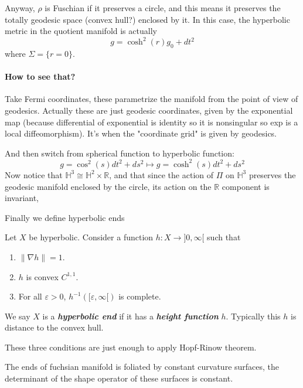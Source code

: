  Anyway, $\rho$ is Fuschian if it preserves a circle, and this means it preserves the totally geodesic space (convex hull?) enclosed by it. In this case, the hyperbolic metric in the quotient manifold is actually
 \[g=\cosh^2(r)g_0+dt^2\]
 where $\Sigma=\{r=0\}$.

 \paragraph{How to see that?}  Take Fermi coordinates, these parametrize the manifold from the point of view of geodesics. Actually these are just geodesic coordinates, given by the exponential map (because differential of exponential is identity so it is nonsingular so exp is a local diffeomorphism). It's when the "coordinate grid" is given by geodesics.

 And then switch from spherical function to hyperbolic function:
 \[g=\cos^2(s)dt^2+ds^2\longmapsto g=\cosh^2(s)dt^2+ds^2 \]
 Now notice that $\mathbb{H}^{3}\cong \mathbb{H}^{2}\times \mathbb{R}$, and that since the action of $\Pi$ on $\mathbb{H}^{3}$ preserves the geodesic manifold enclosed by the circle, its action on the $\mathbb{R}$ component is invariant, 

Finally we define hyperbolic ends

\begin{defn}\leavevmode
	Let $X$ be hyperbolic. Consider a function $h:X\longrightarrow ]0,\infty[$ such that
	\begin{enumerate}
		\item $\|\nabla h\|=1$.
		\item $h$ is convex $C^{1,1}$.
		\item For all $\varepsilon>0$, $h^{-1}([\varepsilon,\infty[)$ is complete.
	\end{enumerate}
	We say $X$ is a \textit{\textbf{hyperbolic end}} if it has a  \textit{\textbf{height function}}  $h$. Typically this $h$ is distance to the convex hull.
\end{defn}

\begin{remark}\leavevmode
	These three conditions are just enough to apply Hopf-Rinow theorem.
\end{remark}

\begin{upshot}\leavevmode
	The ends of fuchsian manifold is foliated by constant curvature surfaces, the determinant of the shape operator of these surfaces is constant.
\end{upshot}


